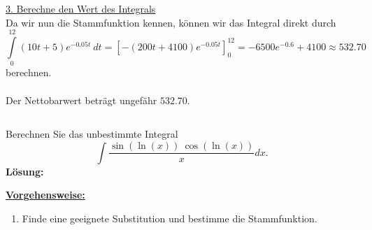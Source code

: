 \newpage
\underline{3. Berechne den Wert des Integrals}\\
Da wir nun die Stammfunktion kennen, können wir das Integral direkt durch
\begin{equation*}
\int \limits_0^{12} (10t + 5) e^{-0.05 t} \ dt
=  \left[ -(200 t +4100) e^{-0.05 t} \right]_0^{12}
= -6500 e^{-0.6 }+4100 
\approx 532.70
\end{equation*}
berechnen.\\
\\
Der Nettobarwert beträgt ungefähr $532.70$.

\newpage
\subsection*{}
Berechnen Sie das unbestimmte Integral
\begin{equation*}
\int \frac{\sin(\ln(x)) \ \cos(\ln(x))}{x} dx.
\end{equation*}
\textbf{Lösung:}
\begin{mdframed}
\underline{\textbf{Vorgehensweise:}}
\begin{enumerate}
\item Finde eine geeignete Substitution und bestimme die Stammfunktion.
\end{enumerate}
\end{mdframed}

